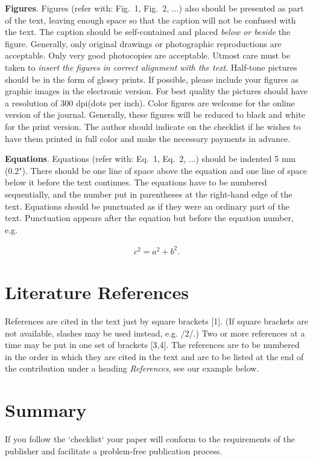 \documentclass{TTP_DSL2006}
\begin{document}
\textbf{Figures}. Figures (refer with: Fig.~1, Fig.~2, ...) also should be presented as part of the text, leaving enough space so that the 
caption will not be confused with the text. The caption should be self-contained and placed \textit{below or beside }the 
figure. Generally, only original drawings or photographic reproductions are acceptable. Only very good photocopies are 
acceptable. Utmost care must be taken to \textit{insert the figures in correct alignment with the text}. Half-tone pictures
 should be in the form of glossy prints. If possible, please include your figures as graphic images in the electronic version. 
For best quality the pictures should have a resolution of 300 dpi(dots per inch).
\noindent Color figures are welcome for the online version of the journal. Generally, these figures will be reduced to black 
and white for the print version. The author should indicate on the checklist if he wishes to have them printed in full color 
and make the necessary payments in advance.

\vspace{6pt}
\textbf{Equations}.  Equations (refer with: Eq.~1, Eq.~2, ...) should be indented 5 mm (0.2"). 
There should be one line of space above the equation and one line of space below it before the text continues. 
The equations have to be numbered sequentially, and the number put in parentheses at the right-hand edge of the 
text. Equations should be punctuated as if they were an ordinary part of the text. Punctuation appears after the 
equation but before the equation number, e.g.

\begin{eqnarray}
c^2 = a^2 + b^2.                                                                
\end{eqnarray}

\section{Literature References}

\noindent References are cited in the text just by square brackets [1].
 (If square brackets are not available, slashes may be used instead, e.g. /2/.) 
Two or more references at a time may be put in one set of brackets [3,4]. The 
references are to be numbered in the order in which they are cited in the text and 
are to be listed at the end of the contribution under a heading \textit{References}, 
see our example below. 

\section{Summary}
\noindent If you follow the `checklist` your paper will conform to the requirements
 of the publisher and facilitate a problem-free publication process.
\end{document}

